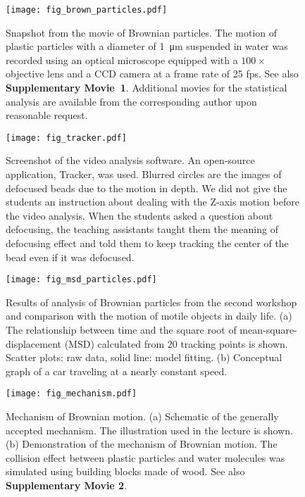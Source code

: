 \documentclass[10pt, aps, prb, preprint, longbibliography, superscriptaddress]{revtex4-2}
\begin{document}
\clearpage

\begin{figure}
	\texttt{[image: fig\_brown\_particles.pdf]}
	\caption{Snapshot from the movie of Brownian particles.
	The motion of plastic particles with a diameter of \SI{1}{\micro m} suspended in water
	was recorded using an optical microscope equipped with a $100\times$ objective lens
	and a CCD camera at a frame rate of 25 fps.
	See also \textbf{Supplementary Movie~1}.
	Additional movies for the statistical analysis are available
	from the corresponding author upon reasonable request.}
	\label{fig_brown_particles}
\end{figure}

\clearpage

\begin{figure}
	\texttt{[image: fig\_tracker.pdf]}
	\caption{Screenshot of the video analysis software.
	An open-source application, Tracker, was used.
	Blurred circles are the images of defocused beads due to the motion in depth.
	We did not give the students an instruction about dealing with the Z-axis motion before the video analysis.
	When the students asked a question about defocusing, the teaching assistants taught them
	the meaning of defocusing effect and told them to keep tracking the center of the bead
	even if it was defocused.}
	\label{fig_tracker}
\end{figure}

\clearpage


\begin{figure}
	\texttt{[image: fig\_msd\_particles.pdf]}
	\caption{Results of analysis of Brownian particles from the second workshop and
	comparison with the motion of motile objects in daily life.
	(a) The relationship between time and the square root of mean-square-displacement (MSD)
	calculated from 20 tracking points is shown. Scatter plots:
	raw data, solid line: model fitting.
	(b) Conceptual graph of a car traveling at a nearly constant speed.}
	\label{fig_msd_particles}
\end{figure}

\clearpage

\begin{figure}
	\texttt{[image: fig\_mechanism.pdf]}
	\caption{Mechanism of Brownian motion.
	(a) Schematic of the generally accepted mechanism. The illustration used in the lecture is shown.
	(b) Demonstration of the mechanism of Brownian motion.
	The collision effect between plastic particles and water molecules was simulated using building blocks made of wood.
	See also \textbf{Supplementary Movie 2}.}
	\label{fig_mechanism}
\end{figure}
\end{document}
